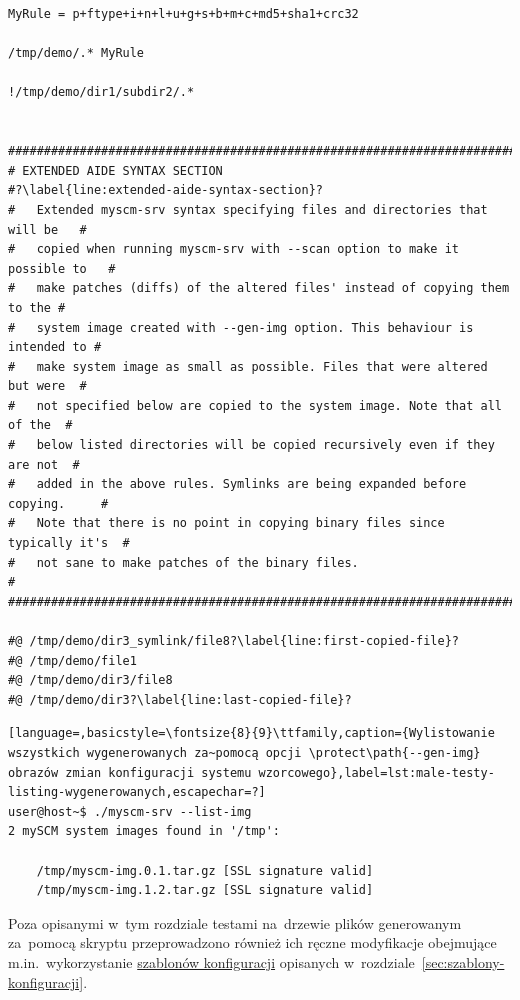 \documentclass[thesis]{subfiles}
\begin{document}
\begin{lstlisting}
MyRule = p+ftype+i+n+l+u+g+s+b+m+c+md5+sha1+crc32

/tmp/demo/.* MyRule

!/tmp/demo/dir1/subdir2/.*


###############################################################################
# EXTENDED AIDE SYNTAX SECTION                                                #?\label{line:extended-aide-syntax-section}?
#   Extended myscm-srv syntax specifying files and directories that will be   #
#   copied when running myscm-srv with --scan option to make it possible to   #
#   make patches (diffs) of the altered files' instead of copying them to the #
#   system image created with --gen-img option. This behaviour is intended to #
#   make system image as small as possible. Files that were altered but were  #
#   not specified below are copied to the system image. Note that all of the  #
#   below listed directories will be copied recursively even if they are not  #
#   added in the above rules. Symlinks are being expanded before copying.     #
#   Note that there is no point in copying binary files since typically it's  #
#   not sane to make patches of the binary files.                             #
###############################################################################

#@ /tmp/demo/dir3_symlink/file8?\label{line:first-copied-file}?
#@ /tmp/demo/file1
#@ /tmp/demo/dir3/file8
#@ /tmp/demo/dir3?\label{line:last-copied-file}?
\end{lstlisting}
\label{male-testy-plik-konfiguracyjny-last-page} %

\begin{minipage}{\linewidth}
\begin{lstlisting}[language=,basicstyle=\fontsize{8}{9}\ttfamily,caption={Wylistowanie wszystkich wygenerowanych za~pomocą opcji \protect\path{--gen-img} obrazów zmian konfiguracji systemu wzorcowego},label=lst:male-testy-listing-wygenerowanych,escapechar=?]
user@host~$ ./myscm-srv --list-img
2 mySCM system images found in '/tmp':

    /tmp/myscm-img.0.1.tar.gz [SSL signature valid]
    /tmp/myscm-img.1.2.tar.gz [SSL signature valid]
\end{lstlisting}
\end{minipage}

Poza opisanymi w~tym rozdziale testami na~drzewie plików generowanym za~pomocą skryptu  przeprowadzono również ich ręczne modyfikacje obejmujące m.in.~wykorzystanie \hyperref[sec:szablony-konfiguracji]{szablonów konfiguracji} opisanych w~rozdziale~\ref{sec:szablony-konfiguracji}.
\end{document}
